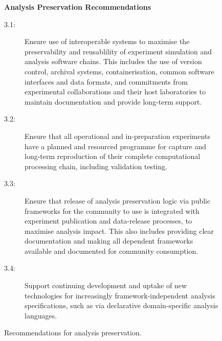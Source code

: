 \documentclass[11pt]{article}
\begin{document}
\begin{figure}[!ht]
\begin{tcolorbox}
\begin{center}
{\large \textbf{Analysis Preservation Recommendations}}
\end{center}
%
\begin{description}
   \item[3.1:] Ensure use of interoperable systems to maximise the preservability and reusablility of experiment simulation and analysis software chains. This includes the use of version control, archival systems, containerisation, common software interfaces and data formats, and commitments from experimental collaborations and their host laboratories to maintain documentation and provide long-term support.
   
   \item[3.2:] Ensure that all operational and in-preparation experiments have a planned and resourced programme for capture and long-term reproduction of their complete computational processing chain, including validation testing.
   
   \item[3.3:] Ensure that release of \gls{analysis preservation} logic via public frameworks for the community to use is integrated with experiment publication and data-release processes, to maximise analysis impact. This also includes providing clear documentation and making all dependent frameworks available and documented for community consumption.

   \item[3.4:] Support continuing development and uptake of new technologies for increasingly framework-independent analysis specifications, such as via declarative domain-specific analysis languages.

   
\end{description}
\end{tcolorbox}
\caption{Recommendations for analysis preservation.}
\label{fig:recs_analysispreservation}
\end{figure}


\end{document}
